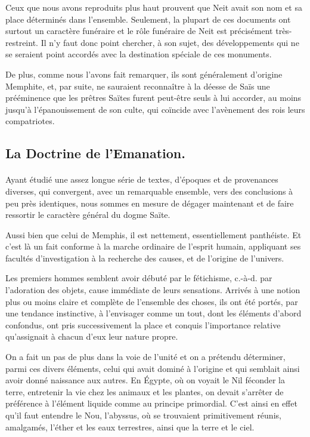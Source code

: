 \documentclass[a4paper, 11pt, oneside]{article}
\begin{document}
Ceux que nous avons reproduits plus haut prouvent que Neit avait son nom et sa place déterminés dans l'ensemble. Seulement, la plupart de ces documents ont surtout un caractère funéraire et le rôle funéraire de Neit est précisément très-restreint. Il n'y faut donc point chercher, à son sujet, des développements qui ne se seraient point accordés avec la destination spéciale de ces monuments.

De plus, comme nous l'avons fait remarquer, ils sont généralement d'origine Memphite, et, par suite, ne sauraient reconnaître à la déesse de Saïs une prééminence que les prêtres Saïtes furent peut-être seuls à lui accorder, au moins jusqu'à l'épanouissement de son culte, qui coïncide avec l'avènement des rois leurs compatriotes.
\clearpage
\subsection{La Doctrine de l'Emanation.}
\paragraph{}
Ayant étudié une assez longue série de textes, d'époques et de provenances diverses, qui convergent, avec un remarquable ensemble, vers des conclusions à peu près identiques, nous sommes en mesure de dégager maintenant et de faire ressortir le caractère général du dogme Saïte.

Aussi bien que celui de Memphis, il est nettement, essentiellement panthéiste. Et c'est là un fait conforme à la marche ordinaire de l'esprit humain, appliquant ses facultés d'investigation à la recherche des causes, et de l'origine de l'univers.

Les premiers hommes semblent avoir débuté par le fétichisme, c.-à-d. par l'adoration des objets, cause immédiate de leurs sensations. Arrivés à une notion plus ou moins claire et complète de l'ensemble des choses, ils ont été portés, par une tendance instinctive, à l'envisager comme un tout, dont les éléments d'abord confondus, ont pris successivement la place et conquis l'importance relative qu'assignait à chacun d'eux leur nature propre.

On a fait un pas de plus dans la voie de l'unité et on a prétendu déterminer, parmi ces divers éléments, celui qui avait dominé à l'origine et qui semblait ainsi avoir donné naissance aux autres. En Égypte, où on voyait le Nil féconder la terre, entretenir la vie chez les animaux et les plantes, on devait s'arrêter de préférence à l'élément liquide comme au principe primordial. C'est ainsi en effet qu'il faut entendre le Nou, l'abyssus, où se trouvaient primitivement réunis, amalgamés, l'éther et les eaux terrestres, ainsi que la terre et le ciel.
\end{document}
